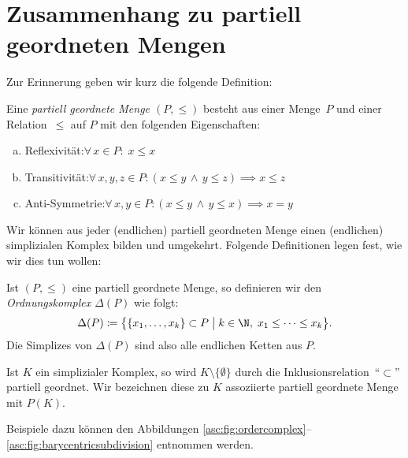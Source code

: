 \section{Zusammenhang zu partiell geordneten Mengen}
Zur Erinnerung geben wir kurz die folgende Definition:

\begin{thDef}
    Eine \emph{partiell geordnete Menge $(P,\leq)$} besteht aus einer Menge~$P$
    und einer Relation~$\leq$ auf $P$ mit den folgenden Eigenschaften:
    \begin{enumerate}[a)]
        \item
            Reflexivität:\quad $\forall\, x\in P\colon\; x \leq x$
        \item
            Transitivität:\quad $\forall\, x,y,z\in P\colon 
            (x\leq y \,\wedge\, y\leq z) \implies x \leq z$
        \item
            Anti-Symmetrie:\quad $\forall\, x,y\in P\colon
            (x\leq y \,\wedge\, y\leq x) \implies x = y$
    \end{enumerate}
\end{thDef}

Wir können aus jeder (endlichen) partiell geordneten Menge einen (endlichen)
simplizialen Komplex bilden und umgekehrt.
Folgende Definitionen legen fest, wie wir dies tun wollen:

\begin{thDef}[Ordnungskomplex]
    Ist $(P,\leq)$ eine partiell geordnete Menge, so definieren wir den
    \emph{Ordnungskomplex $\Delta(P)$} wie folgt:
    \[ \Delta(P) \defeq \bigl\{ \{x_1,\ldots,x_k\} \subset P \cMid[\;]\big 
        k\in\N,\; x_1\leq \dots \leq x_k \bigr\}
    . \]
    Die Simplizes von $\Delta(P)$ sind also alle endlichen Ketten aus $P$.
\end{thDef}

\begin{thDef}
    Ist $K$ ein simplizialer Komplex, so wird
    $K\setminus\{\emptyset\}$ durch die Inklusionsrelation~\enquote{$\subset$} 
    partiell geordnet. Wir bezeichnen diese zu $K$ assoziierte 
    partiell geordnete Menge mit $P(K)$.
\end{thDef}

Beispiele dazu können den Abbildungen
\ref{asc:fig:ordercomplex}--\ref{asc:fig:barycentricsubdivision}
entnommen werden.


